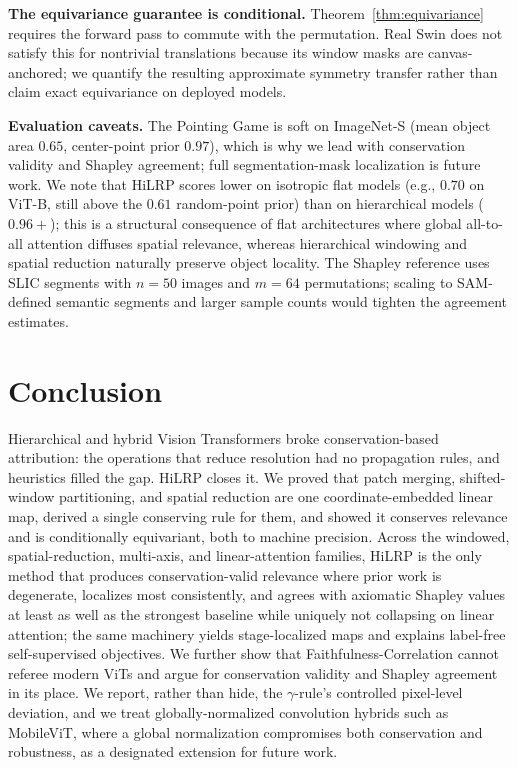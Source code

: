 \documentclass[lettersize,journal]{IEEEtran}
\begin{document}
\textbf{The equivariance guarantee is conditional.} Theorem~\ref{thm:equivariance} requires the forward pass to commute with the permutation. Real Swin does not satisfy this for nontrivial translations because its window masks are canvas-anchored; we quantify the resulting approximate symmetry transfer rather than claim exact equivariance on deployed models.

\textbf{Evaluation caveats.} The Pointing Game is soft on ImageNet-S (mean object area $0.65$, center-point prior $0.97$), which is why we lead with conservation validity and Shapley agreement; full segmentation-mask localization is future work. We note that HiLRP scores lower on isotropic flat models (e.g., $0.70$ on ViT-B, still above the $0.61$ random-point prior) than on hierarchical models ($0.96+$); this is a structural consequence of flat architectures where global all-to-all attention diffuses spatial relevance, whereas hierarchical windowing and spatial reduction naturally preserve object locality. The Shapley reference uses SLIC segments with $n{=}50$ images and $m{=}64$ permutations; scaling to SAM-defined semantic segments and larger sample counts would tighten the agreement estimates.

\section{Conclusion}
\label{sec:conclusion}
Hierarchical and hybrid Vision Transformers broke conservation-based attribution: the operations that reduce resolution had no propagation rules, and heuristics filled the gap. HiLRP closes it. We proved that patch merging, shifted-window partitioning, and spatial reduction are one coordinate-embedded linear map, derived a single conserving rule for them, and showed it conserves relevance and is conditionally equivariant, both to machine precision. Across the windowed, spatial-reduction, multi-axis, and linear-attention families, HiLRP is the only method that produces conservation-valid relevance where prior work is degenerate, localizes most consistently, and agrees with axiomatic Shapley values at least as well as the strongest baseline while uniquely not collapsing on linear attention; the same machinery yields stage-localized maps and explains label-free self-supervised objectives. We further show that Faithfulness-Correlation cannot referee modern ViTs and argue for conservation validity and Shapley agreement in its place. We report, rather than hide, the $\gamma$-rule's controlled pixel-level deviation, and we treat globally-normalized convolution hybrids such as MobileViT, where a global normalization compromises both conservation and robustness, as a designated extension for future work.




\vfill
\end{document}

